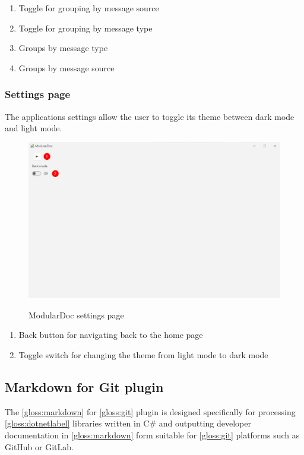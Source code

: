 \begin{enumerate}
    \item Toggle for grouping by message source
    \item Toggle for grouping by message type
    \item Groups by message type
    \item Groups by message source
\end{enumerate}

\pagebreak
\subsubsection{Settings page}

The applications settings allow the user to toggle its theme between dark mode and light mode.

\begin{figure}[H]
    \includegraphics[width=\linewidth]{img/modularDocSettings.png}
    \label{fig:modularDocSettingsPage}
    \caption{ModularDoc settings page}
\end{figure}

\begin{enumerate}
    \item Back button for navigating back to the home page
    \item Toggle switch for changing the theme from light mode to dark mode
\end{enumerate}

\pagebreak
\subsection{Markdown for Git plugin}

The \ref{gloss:markdown} for \ref{gloss:git} plugin is designed specifically for processing \ref{gloss:dotnetlabel} libraries written in C\# and outputting developer documentation in \ref{gloss:markdown} form suitable for \ref{gloss:git} platforms such as GitHub or GitLab.

